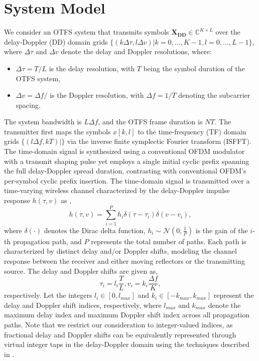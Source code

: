 \documentclass[journal]{IEEEtran}
\begin{document}
\section{System Model}
We consider an OTFS system that transmits symbols $\bm{X_{DD}}\in \mathbb{C}^{K\times L}$ over the delay-Doppler (DD) domain grids $\{(k\Delta\tau, l\Delta v)|k=0,...,K-1, l=0,...,L-1\}$, where $\Delta\tau$ and $\Delta v$ denote the delay and Doppler resolutions, where:
\begin{itemize}[label={--}] %
    \item $\Delta\tau=T/L$ is the delay resolution, with $T$ being the symbol duration of the OTFS system,
    \item $\Delta v=\Delta f/$ is the Doppler resolution, with $\Delta f=1/T$ denoting the subcarrier spacing.
\end{itemize}

The system bandwidth is $L\Delta f$, and the OTFS frame duration is $NT$. The transmitter first maps the symbols $x[k,l]$ to the time-frequency (TF) domain grids $\{(l\Delta f, kT)|\}$ via the inverse finite symplectic Fourier transform (ISFFT). The time-domain signal is synthesized using a conventional OFDM modulator with a transmit shaping pulse yet employs a single initial cyclic prefix spanning the full delay-Doppler spread duration, contrasting with conventional OFDM's per-symbol cyclic prefix insertion. The time-domain signal is transmitted over a time-varying wireless channel characterized by the delay-Doppler impulse response $h(\tau, v)$ as \cite{7925924},
\begin{equation}
h(\tau, v) = \sum_{i=1}^P h_i \delta (\tau - {\tau}_i) \delta (v - v_i) ,
\end{equation}
where $\delta(\cdot)$ denotes the Dirac delta function, $h_i \sim \mathcal{N}(0, \frac{1}{P})$ is the gain of the $i$-th propagation path, and $P$ represents the total number of paths. Each path is characterized by distinct delay and/or Doppler shifts, modeling the channel response between the receiver and either moving reflectors or the transmitting source. The delay and Doppler shifts are given as,
\begin{equation}
{\tau}_i = l_i \frac{T}{L}, v_i = k_i \frac{\Delta f}{K},
\end{equation}
respectively. Let the integers $l_i \in [0, l_{max}]$ and $k_i \in [-k_{max}, k_{max}]$ represent the delay and Doppler shift indices, respectively, where $l_{max}$ and $k_{max}$ denote the maximum delay index and maximum Doppler shift index across all propagation paths. Note that we restrict our consideration to integer-valued indices, as fractional delay and Doppler shifts can be equivalently represented through virtual integer taps in the delay-Doppler domain using the techniques described in \cite{6563167, 8377159, 8516353}.
\end{document}
